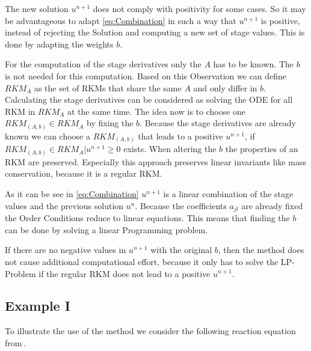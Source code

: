 \documentclass[a4paper]{scrartcl}
\numberwithin{equation}{section}
\theoremstyle{plain}
\theoremstyle{definition}
\numberwithin{theorem}{section}
\newcommand{\1}{\mathbbm{1}}
\begin{document}
The new solution $u^{n+1}$ does not comply with positivity for some cases. 
So it may be advantageous to adapt \eqref{eq:Combination} in such a way that $u^{n+1}$ is positive, instead of rejecting the Solution and computing a new set of stage values. This is done by adapting the weights $b$.




For the computation of the stage derivatives only the $A$ has to be known. The $b$ is not needed for this computation. 
Based on this Observation we can define $RKM_{A}$ as the set of RKMs that share the same $A$ and only differ in $b$.
Calculating the stage derivatives can be considered as solving the ODE for all RKM in $RKM_A$ at the same time.
The idea now is to choose one $RKM_{(A,b)} \in RKM_{A}$ by fixing the $b$. 
Because the stage derivatives are already known we can choose a $RKM_{(A,b)}$ that leads to a positive $u^{n+1}$, if $RKM_{(A,b)} \in RKM_{A} | u^{n+1} \geq 0$ exists.
When altering the $b$ the properties of an RKM are preserved. 
Especially this approach preserves linear invariants like mass conservation, because it is a regular RKM. 

As it can be see in \eqref{eq:Combination} $u^{n+1}$ is a linear combination of the stage values and the previous solution $u^n$.
Because the coefficients $a_{jl}$ are already fixed the Order Conditions reduce to linear equations.
This means that finding the $b$ can be done by solving a linear Programming problem.
 
If there are no negative values in $u^{n+1}$ with the original $b$, then the method does not cause additional computational effort, because it only has to solve the LP-Problem if the regular RKM does not lead to a positive $u^{n+1}$. %



\subsection{Example I}\label{sec:example_reac}

To illustrate the use of the method we consider the following reaction equation from\,\cite{kopecz_comparison_2019}.
\end{document}
